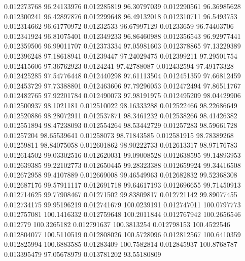 0.012273768	96.24133976
0.012285819	96.30797039
0.012290561	96.36985628
0.012300241	96.42897876
0.012299648	96.49132018
0.012310711	96.5493753
0.012314662	96.61770972
0.01232533	96.67997129
0.01233659	96.74403706
0.012341924	96.81075401
0.012349233	96.86460988
0.012356543	96.92977441
0.012359506	96.99011707
0.012373334	97.05981603
0.012378865	97.13229389
0.012396248	97.18618941
0.01239447	97.24029475
0.012399211	97.29501754
0.012415606	97.36762923
0.0124241	97.42788087
0.012432594	97.49173328
0.012425285	97.54776448
0.012440298	97.61113504
0.012451359	97.66812459
0.012453729	97.73388801
0.012463606	97.79296053
0.012472494	97.86511767
0.012482765	97.92201784
0.012490073	97.98191975
0.012495209	98.04429906
0.012500937	98.1021181
0.012510022	98.16333288
0.012522466	98.22686649
0.012520886	98.28072911
0.012537871	98.3461232
0.012538266	98.41426382
0.012551894	98.47238093
0.012554264	98.53442729
0.01257283	98.59661728
0.01257204	98.65539641
0.01258073	98.71843585
0.012581915	98.78389268
0.01259811	98.84075058
0.012601862	98.90222733
0.012613317	98.97176783
0.012614502	99.03302516
0.012620031	99.09008528
0.012638595	99.14893953
0.012639385	99.22102773
0.012650445	99.28323388
0.012659924	99.34416508
0.012672958	99.4107889
0.012669008	99.46549963
0.012682832	99.52368308
0.012687176	99.57911117
0.012691718	99.64617193
0.012696655	99.71450913
0.012714625	99.77908467
0.01271502	99.83809817
0.012721142	99.89077455
0.012734175	99.95196219
0.012741679	100.0239191
0.012747011	100.0797773
0.012757081	100.1416332
0.012759648	100.2011844
0.012767942	100.2656546
0.012779	100.3265182
0.012791637	100.3813254
0.012798153	100.4522546
0.012804077	100.5110519
0.012808026	100.5728096
0.012812567	100.6410359
0.012825994	100.6883585
0.01283409	100.7582814
0.012845937	100.8768787
0.013395479	97.05678979
0.013781202	93.55180809
